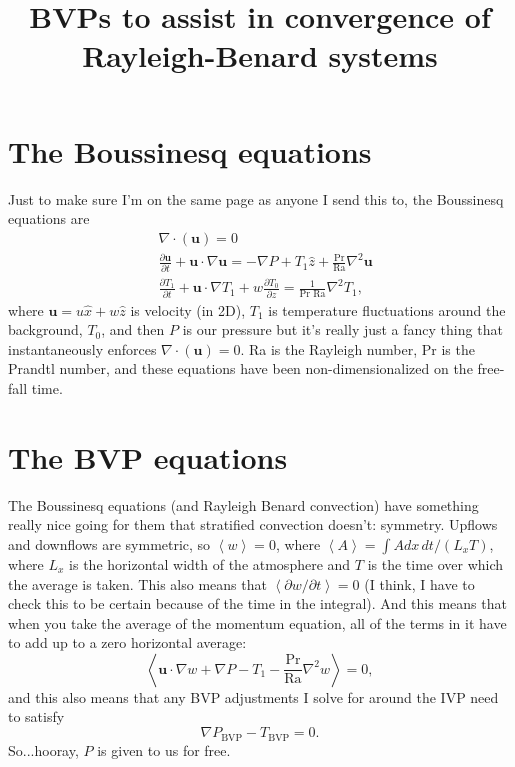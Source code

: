 \documentclass[aps, pre, onecolumn, nofootinbib, notitlepage, groupedaddress, amsfonts, amssymb, amsmath, longbibliography]{revtex4-1}
\newcommand{\Div}[1]{\ensuremath{\nabla\cdot\left( #1\right)}}
\newcommand{\angles}[1]{\ensuremath{\left\langle #1 \right\rangle}}
\newcommand{\grad}{\ensuremath{\nabla}}
\begin{document}
\title{BVPs to assist in convergence of Rayleigh-Benard systems}
\maketitle

\section{The Boussinesq equations}
Just to make sure I'm on the same page as anyone I send this to, the Boussinesq equations are
\begin{equation}
\begin{split}
&\Div{\bm{u}} = 0 \\
&\frac{\partial \bm{u}}{\partial t} + \bm{u}\cdot\grad\bm{u} = -\grad P + T_1\hat{z} + \frac{\text{Pr}}{\text{Ra}}\grad^2 \bm{u} \\
&\frac{\partial T_1}{\partial t} + \bm{u}\cdot\grad T_1 + w\frac{\partial T_0}{\partial z} = \frac{1}{\text{Pr Ra}}\grad^2 T_1,
\end{split}
\end{equation}
where $\bm{u} = u\hat{x} + w\hat{z}$ is velocity (in 2D), $T_1$ is temperature fluctuations around the background, $T_0$, and then $P$ is our pressure but it's
really just a fancy thing that instantaneously enforces $\Div{\bm{u}} = 0$.  Ra is the Rayleigh number,
Pr is the Prandtl number, and these equations have been non-dimensionalized on the
free-fall time.

\section{The BVP equations}
The Boussinesq equations (and Rayleigh Benard convection) have something really nice
going for them that stratified convection doesn't: symmetry.  Upflows and downflows are
symmetric, so $\angles{w} = 0$, where $\angles{A} = \int A dx\,dt / (L_x T)$, where
$L_x$ is the horizontal width of the atmosphere and $T$ is the time over which the
average is taken.  This also means that $\angles{\partial w / \partial t} = 0$ (I think,
I have to check this to be certain because of the time in the integral).  And this
means that when you take the average of the momentum equation, all of the terms in
it have to add up to a zero horizontal average:
$$
\angles{\bm{u}\cdot\grad w + \grad P - T_1 - \frac{\text{Pr}}{\text{Ra}}\grad^2 w} = 0,
$$
and this also means that any BVP adjustments I solve for around the IVP need to satisfy
$$
\grad P_{\text{BVP}} - T_{\text{BVP}} = 0.
$$
So...hooray, $P$ is given to us for free.
\end{document}
